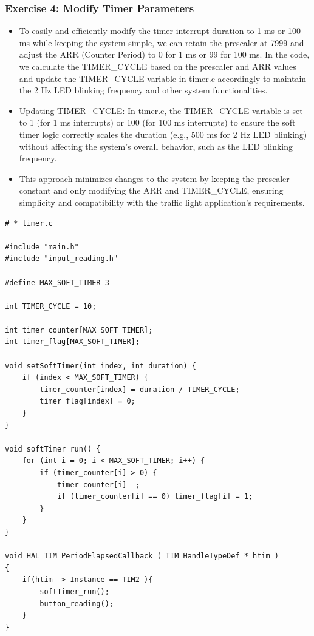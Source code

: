 \documentclass[a4paper,12pt]{article}
\begin{document}
\subsubsection{Exercise 4: Modify Timer Parameters}
\begin{itemize}
	\item[] To easily and efficiently modify the timer interrupt duration to 1 ms or 100 ms while keeping the system simple, we can retain the prescaler at 7999 and adjust the ARR (Counter Period) to 0 for 1 ms or 99 for 100 ms. In the code, we calculate the TIMER\_CYCLE based on the prescaler and ARR values and update the TIMER\_CYCLE variable in timer.c accordingly to maintain the 2 Hz LED blinking frequency and other system functionalities.
	\item[] Updating TIMER\_CYCLE: In timer.c, the TIMER\_CYCLE variable is set to 1 (for 1 ms interrupts) or 100 (for 100 ms interrupts) to ensure the soft timer logic correctly scales the duration (e.g., 500 ms for 2 Hz LED blinking) without affecting the system's overall behavior, such as the LED blinking frequency.
	\item[] This approach minimizes changes to the system by keeping the prescaler constant and only modifying the ARR and TIMER\_CYCLE, ensuring simplicity and compatibility with the traffic light application's requirements.
\end{itemize}
\begin{lstlisting}
# * timer.c	

#include "main.h"
#include "input_reading.h"

#define MAX_SOFT_TIMER 3

int TIMER_CYCLE = 10;

int timer_counter[MAX_SOFT_TIMER];
int timer_flag[MAX_SOFT_TIMER];

void setSoftTimer(int index, int duration) {
	if (index < MAX_SOFT_TIMER) {
		timer_counter[index] = duration / TIMER_CYCLE;
		timer_flag[index] = 0;
	}
}

void softTimer_run() {
	for (int i = 0; i < MAX_SOFT_TIMER; i++) {
		if (timer_counter[i] > 0) {
			timer_counter[i]--;
			if (timer_counter[i] == 0) timer_flag[i] = 1;
		}
	}
}

void HAL_TIM_PeriodElapsedCallback ( TIM_HandleTypeDef * htim )
{
	if(htim -> Instance == TIM2 ){
		softTimer_run();
		button_reading();
	}
}
\end{lstlisting}
\newpage
\end{document}
